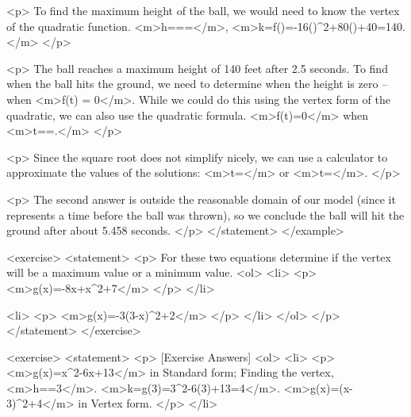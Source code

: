                 <p>
                    To find the maximum height of the ball, we would need to know the vertex of the quadratic function.
                    <m>h===</m>, <m>k=f()=-16()^{2}+80()+40=140.</m>
                </p>

                <p>
                    The ball reaches a maximum height of 140 feet after 2.5 seconds.
                    To find when the ball hits the ground, we need to determine when the height is zero – when <m>f(t) = 0</m>.
                    While we could do this using the vertex form of the quadratic, we can also use the quadratic formula.
                    <m>f(t)=0</m> when <m>t==.</m>
                </p>

                <p>
                    Since the square root does not simplify nicely, we can use a calculator to approximate the values of the solutions: <m>t=</m> or <m>t=</m>.
                </p>

                <p>
                    The second answer is outside the reasonable domain of our model (since it represents a time before the ball was thrown), so we conclude the ball will hit the ground after about 5.458 seconds.
                </p>
            </statement>
        </example>

        <exercise>
            <statement>
                <p>
                    For these two equations determine if the vertex will be a maximum value or a minimum value.
                    <ol>
                        <li>
                            <p>
                                <m>g(x)=-8x+x^{2}+7</m>
                            </p>
                        </li>

                        <li>
                            <p>
                                <m>g(x)=-3(3-x)^{2}+2</m>
                            </p>
                        </li>
                    </ol>
                </p>
            </statement>
        </exercise>

        <exercise>
            <statement>
                <p>
                    [Exercise Answers]
                    <ol>
                        <li>
                            <p>
                                <m>g(x)=x^{2}-6x+13</m> in Standard form; Finding the vertex, <m>h==3</m>. <m>k=g(3)=3^{2}-6(3)+13=4</m>. <m>g(x)=(x-3)^{2}+4</m> in Vertex form.
                            </p>
                        </li>

